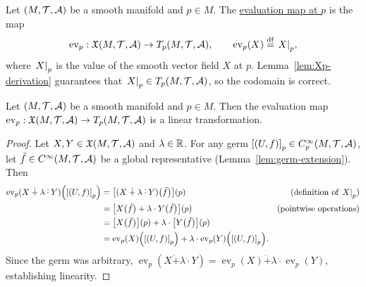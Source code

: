 \documentclass[11pt,reqno]{amsart}
\newcommand{\pwplus}{\mathbin{\dot{+}}}
\newcommand{\pwcdot}{\mathbin{\dot{\cdot}}}
\begin{document}
\begin{Def}\label{def:ev-p}
Let $(M,\mathcal{T},\mathcal{A})$ be a smooth manifold and $p\in M$.
The \ul{evaluation map at $p$} is the map
\[
\operatorname{ev}_p:\X(M,\T,\A)\to T_p(M,\T,\A),\qquad
\operatorname{ev}_p(X)\df \eval{X}_p,
\]
where $\eval{X}_p$ is the value of the smooth vector field $X$ at $p$.
Lemma~\ref{lem:Xp-derivation} guarantees that $\eval{X}_p\in T_p(M,\T,\A)$,
so the codomain is correct.
\end{Def}

\begin{lemma}\label{lem:ev-p-linear}
Let $(M,\mathcal{T},\mathcal{A})$ be a smooth manifold and $p\in M$.
Then the evaluation map $\operatorname{ev}_p:\mathfrak{X}(M,\mathcal{T},\mathcal{A})\to T_p(M,\mathcal{T},\mathcal{A})$
is a linear transformation.
\end{lemma}
\begin{proof}
Let $X,Y\in\mathfrak{X}(M,\mathcal{T},\mathcal{A})$ and $\lambda\in\mathbb{R}$.
For any germ $\SqBr{(U,f)}_p\in C_p^\infty(M,\T,\A)$, let
$\tilde f\in C^\infty(M,\mathcal{T},\mathcal{A})$ be a global representative
(Lemma~\ref{lem:germ-extension}).
Then
\[\begin{aligned}
\operatorname{ev}_p(X\pwplus\lambda\pwcdot Y)\Br{\SqBr{(U,f)}_p}
&=\FUNC{(X\pwplus\lambda\pwcdot Y)\Br{\tilde f}}{p}
&\text{(definition of $\eval{X}_p$)}\\
&=\FUNC{X\Br{\tilde f}+\lambda\cdot Y\Br{\tilde f}}{p}
&\text{(pointwise operations)}\\
&=\FUNC{X\Br{\tilde f}}{p}+\lambda\cdot\FUNC{Y\Br{\tilde f}}{p}\\
&=\operatorname{ev}_p(X)\Br{\SqBr{(U,f)}_p}
+\lambda\cdot\operatorname{ev}_p(Y)\Br{\SqBr{(U,f)}_p}.
\end{aligned}\]
Since the germ was arbitrary,
$\operatorname{ev}_p(X\pwplus\lambda\pwcdot Y)
=\operatorname{ev}_p(X)\pwplus\lambda\pwcdot\operatorname{ev}_p(Y)$,
establishing linearity.
\end{proof}
\end{document}
